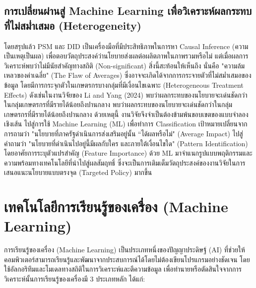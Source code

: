 \subsection{การเปลี่ยนผ่านสู่ Machine Learning เพื่อวิเคราะห์ผลกระทบที่ไม่สม่ำเสมอ (Heterogeneity)}
โดยสรุปแล้ว PSM และ DID เป็นเครื่องมือที่มีประสิทธิภาพในการหา Causal Inference (ความเป็นเหตุเป็นผล) เพื่อตอบวัตถุประสงค์ว่านโยบายส่งผลต่อผลิตภาพในภาพรวมหรือไม่ แต่เมื่อผลการวิเคราะห์พบว่าไม่มีนัยสำคัญทางสถิติ (Non-significant) สิ่งนี้สะท้อนให้เห็นถึง นั่นคือ "ความล้มเหลวของค่าเฉลี่ย" (The Flaw of Averages) ซึ่งอาจจะเกิดได้จากการกระจายตัวที่ไม่สม่ำเสมอของข้อมูล โดยมีการกระจุกตัวในเกษตรกรบางกลุ่มที่มีเงื่อนไขเฉพาะ (Heterogeneous Treatment Effects)  ดังเช่นในงานวิจัยของ Li and Yang (2024) พบว่าผลกระทบของนโยบายจะเด่นชัดกว่าในกลุ่มเกษตรกรที่มีรายได้น้อยถึงปานกลาง พบว่าผลกระทบของนโยบายจะเด่นชัดกว่าในกลุ่มเกษตรกรที่มีรายได้น้อยถึงปานกลาง ด้วยเหตุนี้ งานวิจัยจึงจำเป็นต้องข้ามพ้นขอบเขตของแบบจำลองเชิงเส้น ไปสู่การใช้ Machine Learning (ML) เพื่อทำการ Classification เป้าหมายเปลี่ยนจากการถามว่า "นโยบายที่ภาครัฐดำเนินการส่งเสริมอยู่นั้น “ได้ผลหรือไม่" (Average Impact) ไปสู่คำถามว่า "นโยบายที่ดำเนินไปอยู่นี้มีผลกับใคร และภายใต้เงื่อนไขใด" (Pattern Identification) โดยอาศัยการระบุตัวแปรสำคัญ (Feature Importance) ด้วย ML มาจำแนกรูปแบบพฤติกรรมและความพร้อมทางเทคโนโลยีที่นำไปสู่ผลสัมฤทธิ์ ซึ่งจะเป็นการเติมเต็มวัตถุประสงค์ของงานวิจัยในการเสนอแนะนโยบายแบบตรงจุด (Targeted Policy) มากขึ้น



\section{เทคโนโลยีการเรียนรู้ของเครื่อง (Machine Learning)}
การเรียนรู้ของเครื่อง (Machine Learning) เป็นประเภทหนึ่งของปัญญาประดิษฐ์ (AI) ที่ช่วยให้คอมพิวเตอร์สามารถเรียนรู้และพัฒนาจากประสบการณ์ได้โดยไม่ต้องเขียนโปรแกรมอย่างชัดเจน โดยใช้อัลกอริทึมและโมเดลทางสถิติในการวิเคราะห์และตีความข้อมูล เพื่อทำนายหรือตัดสินใจจากการวิเคราะห์นั้นการเรียนรู้ของเครื่องมี 3 ประเภทหลัก ได้แก่:

